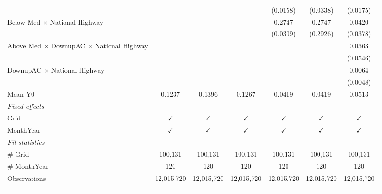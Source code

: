 \begin{table}[htbp]
\begin{tabular}{lcccccc}
                                                              &               &               &               & (0.0158)      & (0.0338)      & (0.0175)\\   
      Below Med $\times$ National Highway                     &               &               &               & 0.2747        & 0.2747        & 0.0420\\   
                                                              &               &               &               & (0.0309)      & (0.2926)      & (0.0378)\\   
      Above Med $\times$ DownupAC $\times$ National Highway   &               &               &               &               &               & 0.0363\\   
                                                              &               &               &               &               &               & (0.0546)\\   
      DownupAC $\times$ National Highway                      &               &               &               &               &               & 0.0064\\   
                                                              &               &               &               &               &               & (0.0048)\\   
      \hline Mean Y0                                          & 0.1237        & 0.1396        & 0.1267        & 0.0419        & 0.0419        & 0.0513\\  
      \midrule
      \emph{Fixed-effects}\\
      Grid                                                    & $\checkmark$  & $\checkmark$  & $\checkmark$  & $\checkmark$  & $\checkmark$  & $\checkmark$\\   
      MonthYear                                               & $\checkmark$  & $\checkmark$  & $\checkmark$  & $\checkmark$  & $\checkmark$  & $\checkmark$\\   
      \midrule
      \emph{Fit statistics}\\
      \# Grid                                                 & 100,131       & 100,131       & 100,131       & 100,131       & 100,131       & 100,131\\  
      \# MonthYear                                            & 120           & 120           & 120           & 120           & 120           & 120\\  
      Observations                                            & 12,015,720    & 12,015,720    & 12,015,720    & 12,015,720    & 12,015,720    & 12,015,720\\  
      \midrule \midrule
                                                              &               &               &               &               &               &  \tabularnewline 
      \\
   \end{tabular}
\end{table}


